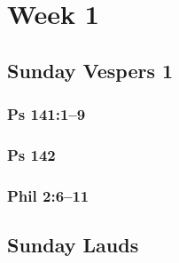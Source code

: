 

\chapter{Week 1}


\section{Sunday Vespers 1}

\subsection{Ps 141:1--9}

{%
\parindent 0pt
\noindent
\ifx\preLilyPondExample \undefined
\else
  \expandafter\preLilyPondExample
\fi
\def\lilypondbook{}%

\ifx\postLilyPondExample \undefined
\else
  \expandafter\postLilyPondExample
\fi
}

\subsection{Ps 142}

{%
\parindent 0pt
\noindent
\ifx\preLilyPondExample \undefined
\else
  \expandafter\preLilyPondExample
\fi
\def\lilypondbook{}%

\ifx\postLilyPondExample \undefined
\else
  \expandafter\postLilyPondExample
\fi
}

\subsection{Phil 2:6--11}

{%
\parindent 0pt
\noindent
\ifx\preLilyPondExample \undefined
\else
  \expandafter\preLilyPondExample
\fi
\def\lilypondbook{}%

\ifx\postLilyPondExample \undefined
\else
  \expandafter\postLilyPondExample
\fi
}




\section{Sunday Lauds}

